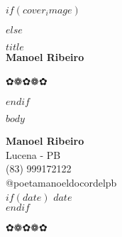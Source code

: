 \documentclass[a6paper,10pt]{book}
\newcommand{\cordelornament}{%
  \begin{center}
    {\Large ✿❁✿❁✿}
  \end{center}
}
\begin{document}
\thispagestyle{empty}
$if(cover_image)$
  
$else$
  \vspace*{\fill}
  \begin{center}
    {\Huge \textbf{$title$}}\\[1.5cm]
    {\Large \textbf{Manoel Ribeiro}}
    \vspace{1cm}
    \cordelornament
  \end{center}
  \vspace*{\fill}
  \clearpage
$endif$

\pagestyle{cordel}
\setcounter{page}{1}

$body$

\clearpage
\thispagestyle{empty}
\begin{center}
  \LARGE \textbf{Manoel Ribeiro}\\[0.5cm]
  \large Lucena - PB\\
  \large (83) 999172122\\
  \large @poetamanoeldocordelpb\\
  $if(date)$
  \large $date$\\
  $endif$
  \cordelornament
\end{center}
\end{document}

